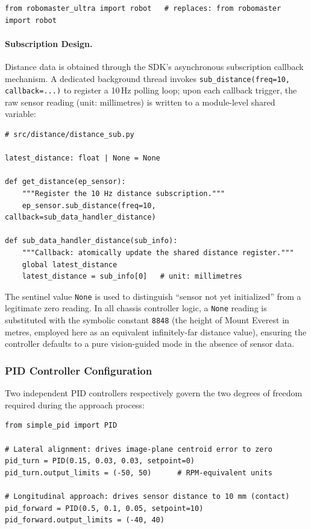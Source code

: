 \begin{verbatim}
from robomaster_ultra import robot   # replaces: from robomaster import robot
\end{verbatim}

\paragraph{Subscription Design.}
Distance data is obtained through the SDK's asynchronous subscription callback mechanism. A dedicated background thread invokes
\texttt{sub\_distance(freq=10, callback=...)} to register a 10\,Hz polling loop;
upon each callback trigger, the raw sensor reading (unit: millimetres) is written to a module-level shared variable:

\begin{verbatim}
# src/distance/distance_sub.py

latest_distance: float | None = None

def get_distance(ep_sensor):
    """Register the 10 Hz distance subscription."""
    ep_sensor.sub_distance(freq=10, callback=sub_data_handler_distance)

def sub_data_handler_distance(sub_info):
    """Callback: atomically update the shared distance register."""
    global latest_distance
    latest_distance = sub_info[0]   # unit: millimetres
\end{verbatim}

The sentinel value \texttt{None} is used to distinguish ``sensor not yet initialized'' from a legitimate zero reading.
In all chassis controller logic, a \texttt{None} reading is substituted with the symbolic constant \texttt{8848}
(the height of Mount Everest in metres, employed here as an equivalent infinitely-far distance value),
ensuring the controller defaults to a pure vision-guided mode in the absence of sensor data.

\subsubsection{PID Controller Configuration}

Two independent PID controllers respectively govern the two degrees of freedom required during the approach process:

\begin{verbatim}
from simple_pid import PID

# Lateral alignment: drives image-plane centroid error to zero
pid_turn = PID(0.15, 0.03, 0.03, setpoint=0)
pid_turn.output_limits = (-50, 50)      # RPM-equivalent units

# Longitudinal approach: drives sensor distance to 10 mm (contact)
pid_forward = PID(0.5, 0.1, 0.05, setpoint=10)
pid_forward.output_limits = (-40, 40)
\end{verbatim}

